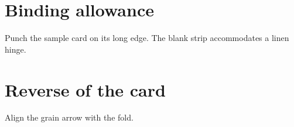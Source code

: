 \documentclass[11pt,twoside,letterpaper]{article}
\begin{document}
\section*{Binding allowance}
Punch the sample card on its long edge. The blank strip accommodates a linen hinge.\newpage\section*{Reverse of the card}Align the grain arrow with the fold.
\end{document}
